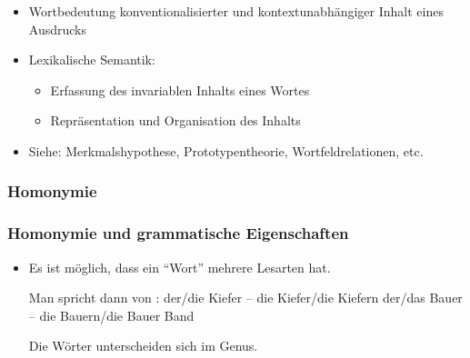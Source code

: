 \begin{frame}
\begin{itemize}
    \pause
    	\item Wortbedeutung \ras konventionalisierter und kontextunabhängiger Inhalt eines Ausdrucks
\pause
	\item Lexikalische Semantik:
	
	\begin{itemize}
		\item Erfassung des invariablen Inhalts eines Wortes
		\item Repräsentation und Organisation des Inhalts
	\end{itemize}
	
\pause
	\item Siehe: Merkmalshypothese, Prototypentheorie, Wortfeldrelationen, etc.


  \end{itemize}
\end{frame}




\subsubsection{Homonymie}

\begin{frame}
\frametitle{Homonymie und grammatische Eigenschaften}

\begin{itemize}
  \item Es ist möglich, dass ein "`Wort"' mehrere Lesarten hat.

Man spricht dann von : 
\eal
\ex der/die Kiefer -- die Kiefer/die Kiefern
\pause
\ex der/das Bauer -- die Bauern/die Bauer
\pause
\ex {} {Band} \pause{}
\zl

Die Wörter unterscheiden sich im Genus.

  \end{itemize}
\end{frame}





